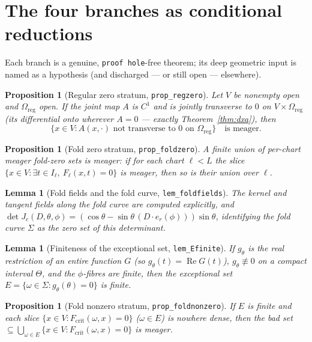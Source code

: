 \documentclass[11pt]{article}
\theoremstyle{plain}
\newtheorem{proposition}[theorem]{Proposition}
\newtheorem{lemma}[theorem]{Lemma}
\theoremstyle{definition}
\theoremstyle{remark}
\newcommand{\cvec}{c}                 %
\newcommand{\Af}{A}                   %
\newcommand{\code}[1]{\texttt{\small #1}}
\DeclareMathOperator{\Real}{Re}
\begin{document}
\section{The four branches as conditional reductions}\label{sec:branches}

Each branch is a genuine, \code{proof hole}-free theorem; its deep geometric input is
named as a hypothesis (and discharged --- or still open --- elsewhere).

\begin{proposition}[Regular zero stratum, \code{prop\_regzero}]
Let $V$ be nonempty open and $\Omega_{\mathrm{reg}}$ open.  If the joint map
$\Af$ is $C^1$ and is jointly transverse to $0$ on $V\times\Omega_{\mathrm{reg}}$
(its differential onto wherever $\Af=0$ --- exactly Theorem~\ref{thm:dxa}), then
\[
  \{x\in V:\Af(x,\cdot)\text{ not transverse to }0\text{ on }\Omega_{\mathrm{reg}}\}
  \quad\text{is meager.}
\]
\end{proposition}

\begin{proposition}[Fold zero stratum, \code{prop\_foldzero}]
A finite union of per-chart meager fold-zero sets is meager: if for each
chart $\ell<L$ the slice $\{x\in V:\exists t\in I_\ell,\ F_\ell(x,t)=0\}$ is
meager, then so is their union over $\ell$.
\end{proposition}

\begin{lemma}[Fold fields and the fold curve, \code{lem\_foldfields}]
The kernel and tangent fields along the fold curve are computed explicitly, and
$\det J_{\cvec}(D,\theta,\phi)=(\cos\theta-\sin\theta\,(D\cdot e_r(\phi)))\sin\theta$,
identifying the fold curve $\Sigma$ as the zero set of this determinant.
\end{lemma}

\begin{lemma}[Finiteness of the exceptional set, \code{lem\_Efinite}]
If $g_\theta$ is the real restriction of an entire function $G$ (so
$g_\theta(t)=\Real G(t)$), $g_\theta\not\equiv0$ on a compact interval $\Theta$,
and the $\phi$-fibres are finite, then the exceptional set
$E=\{\omega\in\Sigma:g_\theta(\theta)=0\}$ is finite.
\end{lemma}

\begin{proposition}[Fold nonzero stratum, \code{prop\_foldnonzero}]
If $E$ is finite and each slice $\{x\in V:F_{\mathrm{crit}}(\omega,x)=0\}$
($\omega\in E$) is nowhere dense, then the bad set $\subseteq\bigcup_{\omega\in
E}\{x\in V:F_{\mathrm{crit}}(\omega,x)=0\}$ is meager.
\end{proposition}
\end{document}
